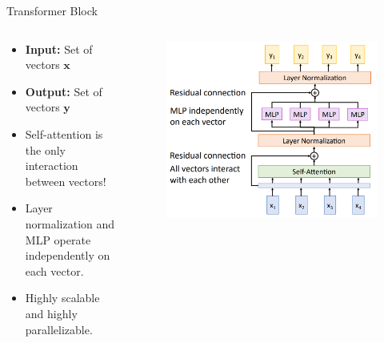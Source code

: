 \begin{frame}{Transformer Block}

\begin{columns}
    \begin{column}{0.5\textwidth}
        \begin{itemize}
            \item \textbf{Input:} Set of vectors $\mathbf{x}$
            \item \textbf{Output:} Set of vectors $\mathbf{y}$
            \vspace{0.5cm}
            \item Self-attention is the only interaction between vectors!
            \item Layer normalization and MLP operate independently on each vector.
            \item Highly scalable and highly parallelizable.
        \end{itemize}
    \end{column}
    \begin{column}{0.5\textwidth}
        \begin{figure}
        \centering
        \includegraphics[width=1.0\textwidth,height=0.9\textheight,keepaspectratio]{images/advanced-cv/transformers_2.png}
        \end{figure} 
    \end{column}
\end{columns}

\end{frame}

